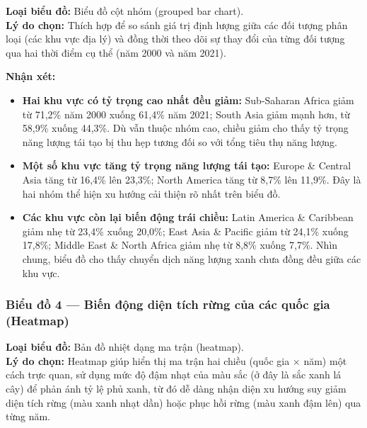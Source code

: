 \textbf{Loại biểu đồ:} Biểu đồ cột nhóm (grouped bar chart).\\
\textbf{Lý do chọn:} Thích hợp để so sánh giá trị định lượng giữa các đối tượng phân loại (các khu vực địa lý) và đồng thời theo dõi sự thay đổi của từng đối tượng qua hai thời điểm cụ thể (năm 2000 và năm 2021).


\textbf{Nhận xét:}
\begin{itemize}
    \item \textbf{Hai khu vực có tỷ trọng cao nhất đều giảm:} Sub-Saharan Africa giảm từ 71,2\% năm 2000 xuống 61,4\% năm 2021; South Asia giảm mạnh hơn, từ 58,9\% xuống 44,3\%. Dù vẫn thuộc nhóm cao, chiều giảm cho thấy tỷ trọng năng lượng tái tạo bị thu hẹp tương đối so với tổng tiêu thụ năng lượng.
    \item \textbf{Một số khu vực tăng tỷ trọng năng lượng tái tạo:} Europe \& Central Asia tăng từ 16,4\% lên 23,3\%; North America tăng từ 8,7\% lên 11,9\%. Đây là hai nhóm thể hiện xu hướng cải thiện rõ nhất trên biểu đồ.
    \item \textbf{Các khu vực còn lại biến động trái chiều:} Latin America \& Caribbean giảm nhẹ từ 23,4\% xuống 20,0\%; East Asia \& Pacific giảm từ 24,1\% xuống 17,8\%; Middle East \& North Africa giảm nhẹ từ 8,8\% xuống 7,7\%. Nhìn chung, biểu đồ cho thấy chuyển dịch năng lượng xanh chưa đồng đều giữa các khu vực.
\end{itemize}

\subsubsection{Biểu đồ 4 --- Biến động diện tích rừng của các quốc gia (Heatmap)}

\textbf{Loại biểu đồ:} Bản đồ nhiệt dạng ma trận (heatmap).\\
\textbf{Lý do chọn:} Heatmap giúp hiển thị ma trận hai chiều (quốc gia $\times$ năm) một cách trực quan, sử dụng mức độ đậm nhạt của màu sắc (ở đây là sắc xanh lá cây) để phản ánh tỷ lệ phủ xanh, từ đó dễ dàng nhận diện xu hướng suy giảm diện tích rừng (màu xanh nhạt dần) hoặc phục hồi rừng (màu xanh đậm lên) qua từng năm.


